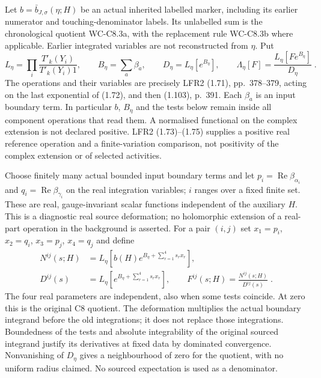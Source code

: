 \documentclass[11pt]{article}
\begin{document}
Let $b=\bar b_{J,\sigma}(\eta;H)$ be an actual inherited labelled
marker, including its earlier numerator and touching-denominator labels.
Its unlabelled sum is the chronological quotient WC-C8.3a, with the
replacement rule WC-C8.3b where applicable. Earlier integrated variables
are not reconstructed from $\eta$. Put
\begin{equation}\label{eq:c8-fourth-bracket}
    L_\eta=\prod_i\frac{T'_k(Y_i)}{T'_k(Y_i)1},\qquad
    B_\eta=\sum_a\beta_a,\qquad
    D_\eta=L_\eta[e^{B_\eta}],\qquad
    \Lambda_\eta[F]=\frac{L_\eta[Fe^{B_\eta}]}{D_\eta}\;.
\end{equation}
The operations and their variables are precisely LFR2 (1.71),
pp.~378--379, acting on the last exponential of (1.72), and then
(1.103), p.~391. Each $\beta_a$ is an input boundary term. In
particular $b$, $B_\eta$ and the tests below remain inside all component
operations that read them. A normalised functional on the complex
extension is not declared positive. LFR2 (1.73)--(1.75) supplies a
positive real reference operation and a finite-variation comparison,
not positivity of the complex extension or of selected activities.

Choose finitely many actual bounded input boundary terms and let
$p_i=\operatorname{Re}\beta_{\alpha_i}$ and
$q_i=\operatorname{Re}\beta_{\gamma_i}$ on the real integration
variables; $i$ ranges over a fixed finite set. These are real,
gauge-invariant scalar functions independent of the auxiliary $H$.
This is a diagnostic real source deformation; no holomorphic extension
of a real-part operation in the background is asserted. For a pair
$(i,j)$ set $x_1=p_i$, $x_2=q_i$, $x_3=p_j$, $x_4=q_j$ and define
\begin{equation}\label{eq:c8-fourth-defined-test}
    \begin{aligned}
        N^{ij}(s;H)&=L_\eta\left[b(H)e^{B_\eta+\sum_{r=1}^{4}s_rx_r}\right],\\
        D^{ij}(s)&=L_\eta\left[e^{B_\eta+\sum_{r=1}^{4}s_rx_r}\right],\qquad
        F^{ij}(s;H)=\frac{N^{ij}(s;H)}{D^{ij}(s)}\;.
    \end{aligned}
\end{equation}
The four real parameters are independent, also when some tests coincide.
At zero this is the original C8 quotient. The deformation multiplies
the actual boundary integrand before the old integrations; it does not
replace those integrations. Boundedness of the tests and absolute
integrability of the original sourced integrand justify its derivatives
at fixed data by dominated convergence. Nonvanishing of $D_\eta$
gives a neighbourhood of zero for the quotient, with no uniform radius
claimed. No sourced expectation is used as a denominator.
\end{document}

